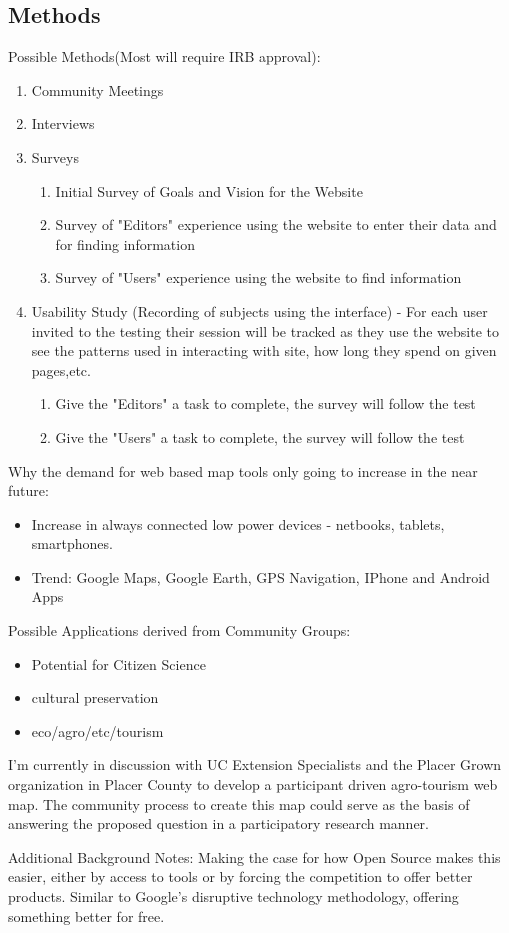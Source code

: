 \documentclass[12pt,letterpaper]{article}
\begin{document}
\subsection{Methods}
Possible Methods(Most will require IRB approval):
\begin{enumerate}
\item Community Meetings
\item Interviews
\item Surveys
	\begin{enumerate}
	\item Initial Survey of Goals and Vision for the Website
	\item Survey of "Editors" experience using the website to enter their data and for finding information
	\item Survey of "Users" experience using the website to find information
	\end{enumerate}
\item Usability Study (Recording of subjects using the interface) - For each user invited to the testing their session will be tracked as they use the website to see the patterns used in interacting with site, how long they spend on given pages,etc.
	\begin{enumerate}
	\item Give the "Editors" a task to complete, the survey will follow the test
	\item Give the "Users" a task to complete, the survey will follow the test
	\end{enumerate}
\end{enumerate}


Why the demand for web based map tools only going to increase in the near future:
\begin{itemize}
\item Increase in always connected low power devices - netbooks, tablets, smartphones.
\item Trend: Google Maps, Google Earth, GPS Navigation, IPhone and Android Apps  
\end{itemize}
Possible Applications derived from Community Groups:
\begin{itemize}
\item Potential for Citizen Science
\item cultural preservation
\item eco/agro/etc/tourism
\end{itemize} 

I'm currently in discussion with UC Extension Specialists and the Placer Grown organization in Placer County to develop a participant driven agro-tourism web map. The community process to create this map could serve as the basis of answering the proposed question in a participatory research manner.

Additional Background Notes:
Making the case for how Open Source makes this easier, either by access to tools or by forcing the competition to offer better products. Similar to Google's disruptive technology methodology, offering something better for free.
\end{document}
